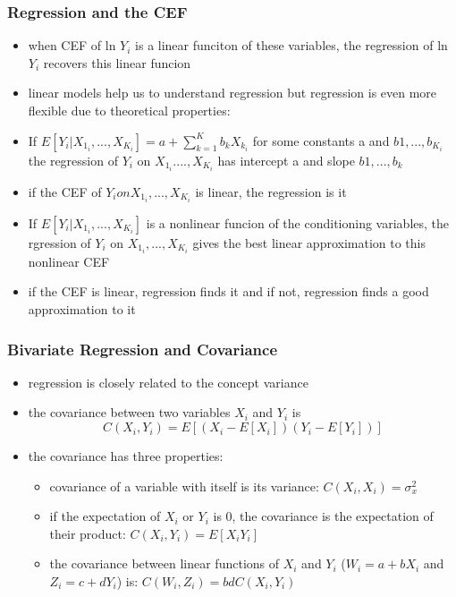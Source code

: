 \documentclass{beamer}
\begin{document}
\begin{frame}
\frametitle{Regression and the CEF}
	\begin{itemize}
		\item when CEF of ln $Y_i$ is a linear funciton of these variables, the regression of ln $Y_i$ recovers this linear funcion
		\item linear models help us to understand regression but regression is even more flexible due to theoretical properties:
		\item If $E[Y_i|X_1_i, ..., X_K_i]= a+\sum_{k=1}^K{{b_kX_k_i}}$ for some constants a and $b1,...,b_K_i$ the regression of $Y_i$ on $X_1_i...., X_K_i$ has intercept a and slope $b1,...,b_k$
		\item if the CEF of $Y_i on X_1_i, ..., X_K_i$ is linear, the regression is it
		\item If $E[Y_i|X_1_i, ..., X_K_i]$ is a nonlinear funcion of the conditioning variables, the rgression of $Y_i$ on $X_1_i, ..., X_K_i$ gives the best linear approximation to this nonlinear CEF
		\item if the CEF is linear, regression finds it and if not, regression finds a good approximation to it
	\end{itemize}
\end{frame}


\begin{frame}
\frametitle{Bivariate Regression and Covariance}
	\begin{itemize}
		\item regression is closely related to the concept variance
		\item the covariance between two variables $X_i$ and $Y_i$ is $$C(X_i,Y_i) = E[(X_i-E[X_i])(Y_i-E[Y_i])]$$
		\item the covariance has three properties:
			\begin{itemize}
				\item covariance of a variable with itself is its variance: $C(X_i,X_i)= \sigma_x^2$
				\item if the expectation of $X_i$ or $Y_i$ is 0, the covariance is the expectation of their product: $C(X_i,Y_i)=E[X_iY_i]$
				\item the covariance between linear functions of $X_i$ and $Y_i$ ($W_i=a+bX_i$ and $Z_i=c+dY_i$) is: $C(W_i,Z_i)=bdC(X_i,Y_i)$
			\end{itemize}
	\end{itemize}

\end{frame}
\end{document}
